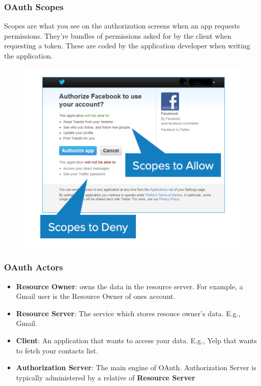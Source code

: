 \documentclass{beamer}
\begin{document}
	\begin{frame}
		\frametitle{OAuth Scopes}
		\begin{block}{Scopes}
			are what you see on the authorization screens when an app requests permissions. They’re bundles of permissions asked for by the client when requesting a token. These are coded by the application developer when writing the application.
		\end{block}
	  	\begin{figure}[hbt!]
			\includegraphics[scale=2.5,height=0.35\paperwidth,keepaspectratio]{oauth-scopes.png}
		\end{figure}
	\end{frame}

	\begin{frame}
		\frametitle{OAuth Actors}
		\begin{itemize}
			\setlength{\itemsep}{20pt}
			\item \textbf{Resource Owner}: owns the data in the resource server. For example, a Gmail user is the Resource Owner of ones account.
			\item \textbf{Resource Server}: The service which stores resouce owner's data. E.g., Gmail.
			\item \textbf{Client}: An application that wants to access your data. E.g., Yelp that wants to fetch your contacts list.
			\item \textbf{Authorization Server}: The main engine of OAuth. Authorization Server is typically administered by a relative of \textbf{Resource Server}
		\end{itemize}
	\end{frame}
\end{document}
